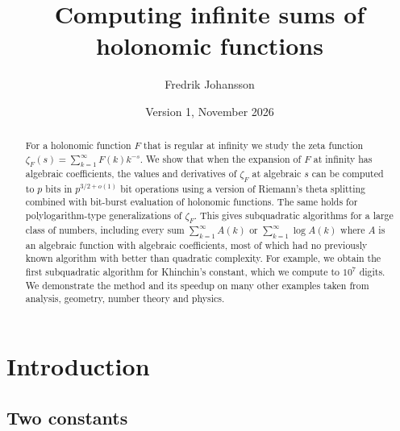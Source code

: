 \documentclass[11pt,reqno]{amsart}
\title[Computing infinite sums of holonomic functions]{Computing infinite sums of holonomic functions}
\author{Fredrik Johansson}
\date{Version 1, November 2026}
\theoremstyle{definition}
\theoremstyle{remark}
\begin{document}
\begin{abstract}
For a holonomic function $F$ that is regular at infinity we study the zeta function
$\zeta_F(s) = \sum_{k=1}^{\infty} F(k)k^{-s}$.
We show that when the expansion of $F$ at infinity has algebraic coefficients, the
values and derivatives of $\zeta_F$ at algebraic $s$ can be computed
to $p$ bits in $p^{3/2+o(1)}$ bit operations
using a version of Riemann's theta splitting
combined with bit-burst evaluation of holonomic functions.
The same holds for polylogarithm-type generalizations of $\zeta_F$.
This gives subquadratic algorithms for a large class of numbers,
including every sum $\sum_{k=1}^{\infty} A(k)$ or $\sum_{k=1}^{\infty} \log A(k)$ where $A$ is an
algebraic function with algebraic coefficients, most of which had no previously known algorithm with better than
quadratic complexity.
For example, we obtain the first subquadratic algorithm for
Khinchin's constant, which we compute to $10^7$ digits.
We demonstrate the method and its speedup on many other examples taken from analysis,
geometry, number theory and physics.
\end{abstract}



\maketitle

\section{Introduction}

\subsection{Two constants}
\end{document}
